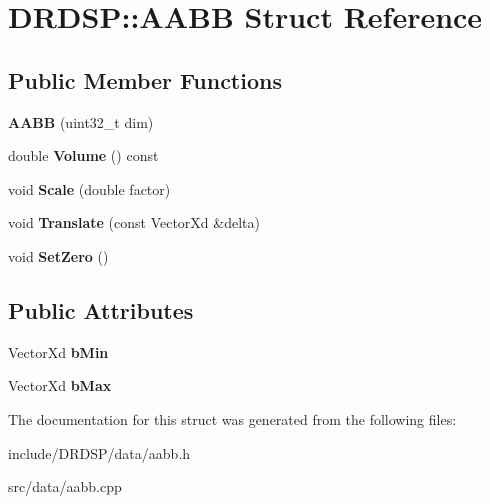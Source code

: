 \hypertarget{struct_d_r_d_s_p_1_1_a_a_b_b}{\section{D\-R\-D\-S\-P\-:\-:A\-A\-B\-B Struct Reference}
\label{struct_d_r_d_s_p_1_1_a_a_b_b}
}
\subsection*{Public Member Functions}
\begin{DoxyCompactItemize}
\item 
\hypertarget{struct_d_r_d_s_p_1_1_a_a_b_b_a1c7e675e120109fe01b9e25163ee1582}{{\bfseries A\-A\-B\-B} (uint32\-\_\-t dim)}\label{struct_d_r_d_s_p_1_1_a_a_b_b_a1c7e675e120109fe01b9e25163ee1582}

\item 
\hypertarget{struct_d_r_d_s_p_1_1_a_a_b_b_afde78b10d7572acdd515b711a11854d2}{double {\bfseries Volume} () const }\label{struct_d_r_d_s_p_1_1_a_a_b_b_afde78b10d7572acdd515b711a11854d2}

\item 
\hypertarget{struct_d_r_d_s_p_1_1_a_a_b_b_aed54140a2475ce0bb49cff8b4672a27e}{void {\bfseries Scale} (double factor)}\label{struct_d_r_d_s_p_1_1_a_a_b_b_aed54140a2475ce0bb49cff8b4672a27e}

\item 
\hypertarget{struct_d_r_d_s_p_1_1_a_a_b_b_a59540823643c20e61f49dac04a167649}{void {\bfseries Translate} (const Vector\-Xd \&delta)}\label{struct_d_r_d_s_p_1_1_a_a_b_b_a59540823643c20e61f49dac04a167649}

\item 
\hypertarget{struct_d_r_d_s_p_1_1_a_a_b_b_abee9488dff679ac9956fc01dbbe5b4ef}{void {\bfseries Set\-Zero} ()}\label{struct_d_r_d_s_p_1_1_a_a_b_b_abee9488dff679ac9956fc01dbbe5b4ef}

\end{DoxyCompactItemize}
\subsection*{Public Attributes}
\begin{DoxyCompactItemize}
\item 
\hypertarget{struct_d_r_d_s_p_1_1_a_a_b_b_a164c8db4daf154b8d0eb5d817849f0c1}{Vector\-Xd {\bfseries b\-Min}}\label{struct_d_r_d_s_p_1_1_a_a_b_b_a164c8db4daf154b8d0eb5d817849f0c1}

\item 
\hypertarget{struct_d_r_d_s_p_1_1_a_a_b_b_a429e3f5162a168b4611cd3b8c70150c1}{Vector\-Xd {\bfseries b\-Max}}\label{struct_d_r_d_s_p_1_1_a_a_b_b_a429e3f5162a168b4611cd3b8c70150c1}

\end{DoxyCompactItemize}


The documentation for this struct was generated from the following files\-:\begin{DoxyCompactItemize}
\item 
include/\-D\-R\-D\-S\-P/data/aabb.\-h\item 
src/data/aabb.\-cpp\end{DoxyCompactItemize}
